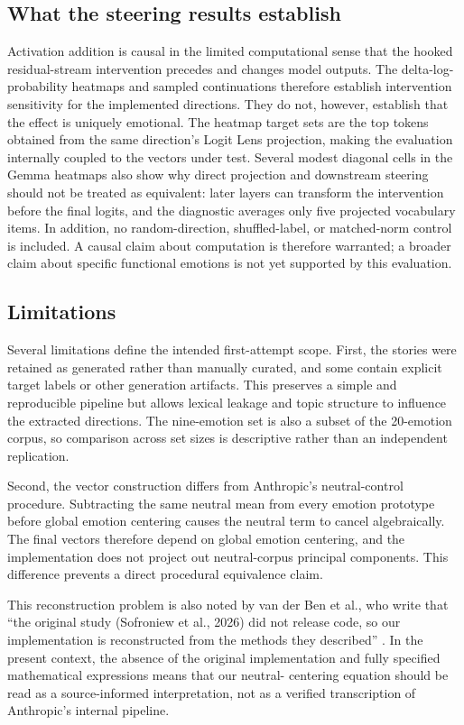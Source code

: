 \subsection{What the steering results establish}

Activation addition is causal in the limited computational sense that the hooked residual-stream intervention precedes and changes 
model outputs. The delta-log-probability heatmaps and sampled continuations therefore establish intervention sensitivity for the 
implemented directions. They do not, however, establish that the effect is uniquely emotional. The heatmap target sets are the 
top tokens obtained from the same direction's Logit Lens projection, making the evaluation internally coupled to the vectors under 
test. Several modest diagonal cells in the Gemma heatmaps also show why direct projection and downstream steering should not be treated 
as equivalent: later layers can transform the intervention before the final logits, and the diagnostic averages only five projected 
vocabulary items. In addition, no random-direction, shuffled-label, or matched-norm control is included. A causal claim about computation is 
therefore warranted; a broader claim about specific functional emotions is not yet supported by this evaluation.

\subsection{Limitations}

Several limitations define the intended first-attempt scope. First, the stories were retained as generated rather than manually 
curated, and some contain explicit target labels or other generation artifacts. This preserves a simple and reproducible pipeline 
but allows lexical leakage and topic structure to influence the extracted directions. The nine-emotion set is also a subset of 
the 20-emotion corpus, so comparison across set sizes is descriptive rather than an independent replication.

Second, the vector construction differs from Anthropic's neutral-control procedure. Subtracting the same neutral mean from every 
emotion prototype before global emotion centering causes the neutral term to cancel algebraically. The final vectors therefore 
depend on global emotion centering, and the implementation does not project out neutral-corpus principal components. This 
difference prevents a direct procedural equivalence claim.

This reconstruction problem is also noted by van der Ben et al., who write that ``the original study (Sofroniew et al., 2026) 
did not release code, so our implementation is reconstructed from the methods they described'' \cite{ben_where_2026}. In the 
present context, the absence of the original implementation and fully specified mathematical expressions means that our neutral-
centering equation should be read as a source-informed interpretation, not as a verified transcription of Anthropic's internal pipeline.

